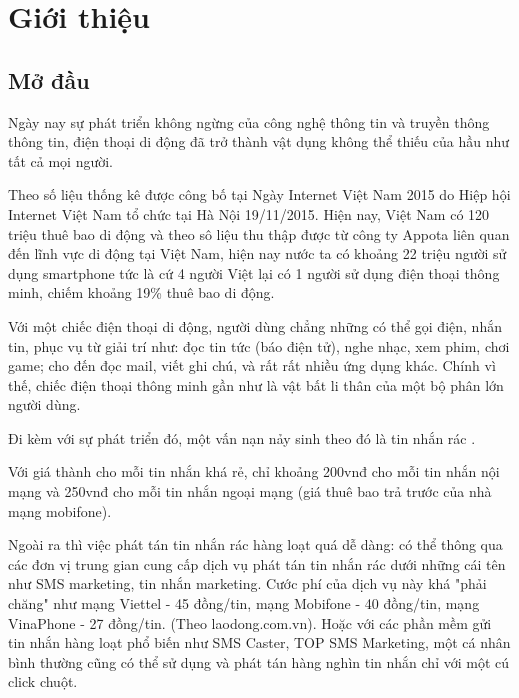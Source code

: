
\chapter{Giới thiệu}
\section{Mở đầu}
Ngày nay sự phát triển không ngừng của công nghệ thông tin và truyền thông thông tin, điện thoại di động đã trở thành vật dụng không thể thiếu của hầu như tất cả mọi người.

Theo số liệu thống kê được công bố tại Ngày Internet Việt Nam 2015 do Hiệp hội Internet Việt Nam tổ chức tại Hà Nội 19/11/2015. Hiện nay, Việt Nam có 120 triệu thuê bao di động và theo sô liệu thu thập được từ công ty Appota liên quan đến lĩnh vực di động tại Việt Nam, hiện nay nước ta có khoảng 22 triệu người sử dụng smartphone tức là cứ 4 người Việt lại có 1 người sử dụng điện thoại thông minh, chiếm khoảng 19\% thuê bao di động.

Với một chiếc điện thoại di động, người dùng chẳng những có thể gọi điện, nhắn tin, phục vụ từ giải trí như: đọc tin tức (báo điện tử), nghe nhạc, xem phim, chơi game; cho đến đọc mail, viết ghi chú, và rất rất nhiều ứng dụng khác. Chính vì thế, chiếc điện thoại thông minh gần như là vật bất li thân của một bộ phân lớn người dùng.
 
Đi kèm với sự phát triển đó, một vấn nạn nảy sinh theo đó là tin nhắn rác \cite{ma2016}.


Với giá thành cho mỗi tin nhắn khá rẻ, chỉ khoảng 200vnđ cho mỗi tin nhắn nội mạng và 250vnđ cho mỗi tin nhắn ngoại mạng (giá thuê bao trả trước của nhà mạng mobifone).

Ngoài ra thì việc phát tán tin nhắn rác hàng loạt quá dễ dàng: có thể thông qua các đơn vị trung gian cung cấp dịch vụ phát tán tin nhắn rác dưới những cái tên như SMS marketing, tin nhắn marketing. Cước phí của dịch vụ này khá "phải chăng" như mạng Viettel - 45 đồng/tin, mạng Mobifone  - 40 đồng/tin, mạng VinaPhone - 27 đồng/tin. (Theo laodong.com.vn). Hoặc với các phần mềm gửi tin nhắn hàng loạt phổ biến như SMS Caster, TOP SMS Marketing, một cá nhân bình thường cũng có thể sử dụng và phát tán hàng nghìn tin nhắn chỉ với một cú click chuột.

